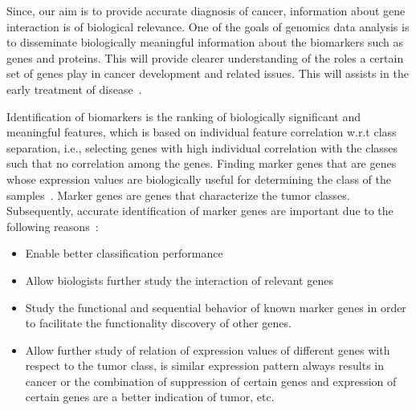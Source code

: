 Since, our aim is to provide accurate diagnosis of cancer, information about gene interaction is of biological relevance. One of the goals of genomics data analysis is to disseminate biologically meaningful information about the biomarkers such as genes and proteins. This will provide clearer understanding of the roles a certain set of genes play in cancer development and related issues. This will assists in the  early treatment of disease~\cite{lu2003cancer}. %

\hspace*{3.5mm} Identification of biomarkers is the ranking of biologically significant and meaningful features, which is based on individual feature correlation w.r.t class separation, i.e., selecting genes with high individual correlation with the classes such that no correlation among the genes. Finding marker genes that are genes whose expression values are biologically useful for determining the class of the samples~\cite{lu2003cancer}. Marker genes are genes that characterize the tumor classes. Subsequently, accurate identification of marker genes are important due to the following reasons~\cite{lu2003cancer}:

\begin{itemize}[noitemsep]
    \item Enable better classification performance
    \item Allow biologists further study the interaction of relevant genes 
    \item Study the functional and sequential behavior of known marker genes in order to facilitate the functionality discovery of other genes.
    \item Allow further study of relation of expression values of different genes with respect to the tumor class, is similar expression pattern always results in cancer or the combination of suppression of certain genes and expression of certain genes are a better indication of tumor, etc.
\end{itemize}


